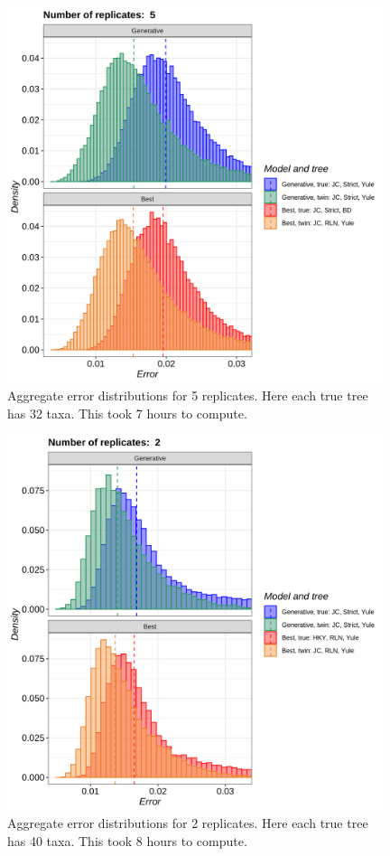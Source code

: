 \begin{figure}[H]
  \includegraphics[width=0.98\textwidth]{pirouette_example_41/errors.png}
  \caption{Aggregate error distributions for 5 replicates. Here each true tree has 32 taxa. This took 7 hours to compute.}
  \label{fig:example_32_taxa}
\end{figure}

\begin{figure}[H]
  \includegraphics[width=0.98\textwidth]{pirouette_example_42/errors.png}
  \caption{Aggregate error distributions for 2 replicates. Here each true tree has 40 taxa. This took 8 hours to compute.}
  \label{fig:example_40_taxa}
\end{figure}

